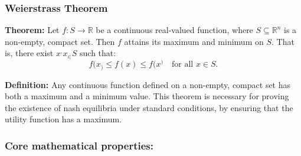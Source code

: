 \documentclass{article}
\begin{document}
\subsubsection{Weierstrass Theorem}\label{weiss}
\textbf{Theorem:} Let \(f: S \to \mathbb{R}\) be a continuous real-valued function, where \(S \subseteq \mathbb{R}^n\) is a non-empty, compact set. Then \(f\) attains its maximum and minimum on \(S\). That is, there exist \(x^, x_ \in S\) such that:
\[
f(x_) \leq f(x) \leq f(x^) \quad \text{for all } x \in S.
\]

\textbf{Definition:} Any continuous function defined on a non-empty, compact set has both a maximum and a minimum value. This theorem is necessary for proving the existence of nash equilibria under standard conditions, by ensuring that the utility function has a maximum. 

\subsubsection{Core mathematical properties:}
\end{document}
